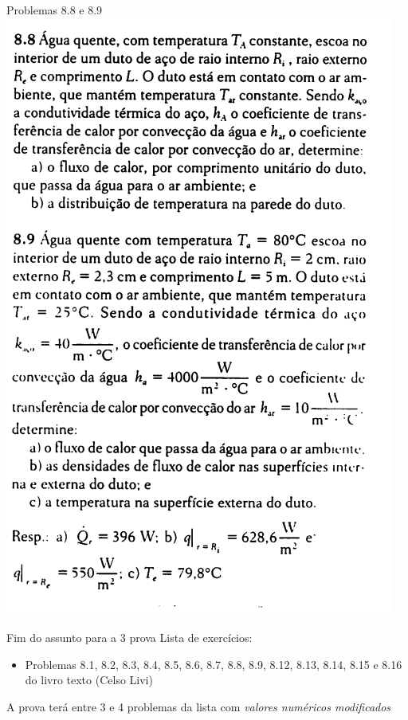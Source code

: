 \documentclass[t,%
brazilian,%
11pt,%
aspectratio=169,%
table%
]{beamer}
\newcommand{\esima}{\textordfeminine }
\begin{document}
\begin{frame}{Problemas 8.8 e 8.9}
    \centering
    \includegraphics[height=\textheight-28pt]{images/Captura de tela de 2025-06-24 16-45-05.png}
\end{frame}

\begin{frame}{Fim do assunto para a 3\esima{} prova}
    Lista de exercícios:
    \begin{itemize}
        \item Problemas 8.1, 8.2, 8.3, 8.4, 8.5, 8.6, 8.7, 8.8, 8.9, 8.12, 8.13, 8.14, 8.15 e 8.16 do livro texto (Celso Livi)
    \end{itemize}

    A prova terá entre 3 e 4 problemas da lista com \textit{valores numéricos modificados}
\end{frame}
\end{document}
